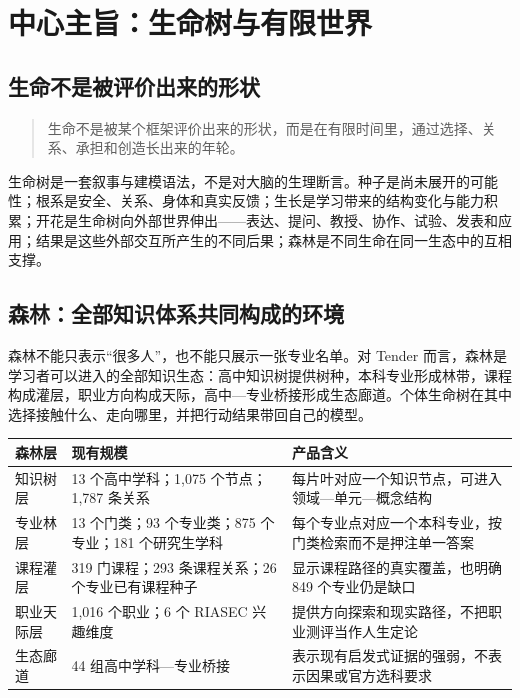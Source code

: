 \documentclass[UTF8,a4paper,11pt]{ctexart}
\begin{document}
\newpage
\section{中心主旨：生命树与有限世界}

\subsection{生命不是被评价出来的形状}

\begin{quote}
\large
生命不是被某个框架评价出来的形状，而是在有限时间里，通过选择、关系、承担和创造长出来的年轮。
\end{quote}

生命树是一套叙事与建模语法，不是对大脑的生理断言。种子是尚未展开的可能性；根系是安全、关系、身体和真实反馈；生长是学习带来的结构变化与能力积累；开花是生命树向外部世界伸出——表达、提问、教授、协作、试验、发表和应用；结果是这些外部交互所产生的不同后果；森林是不同生命在同一生态中的互相支撑。

\subsection{森林：全部知识体系共同构成的环境}

森林不能只表示“很多人”，也不能只展示一张专业名单。对 Tender 而言，森林是学习者可以进入的全部知识生态：高中知识树提供树种，本科专业形成林带，课程构成灌层，职业方向构成天际，高中—专业桥接形成生态廊道。个体生命树在其中选择接触什么、走向哪里，并把行动结果带回自己的模型。

\begin{center}
\begin{longtable}{@{}p{2.8cm}p{4.2cm}p{6.2cm}@{}}
\toprule
\textbf{森林层} & \textbf{现有规模} & \textbf{产品含义} \\
\midrule
知识树层 & 13 个高中学科；1,075 个节点；1,787 条关系 & 每片叶对应一个知识节点，可进入领域—单元—概念结构 \\
专业林层 & 13 个门类；93 个专业类；875 个专业；181 个研究生学科 & 每个专业点对应一个本科专业，按门类检索而不是押注单一答案 \\
课程灌层 & 319 门课程；293 条课程关系；26 个专业已有课程种子 & 显示课程路径的真实覆盖，也明确 849 个专业仍是缺口 \\
职业天际层 & 1,016 个职业；6 个 RIASEC 兴趣维度 & 提供方向探索和现实路径，不把职业测评当作人生定论 \\
生态廊道 & 44 组高中学科—专业桥接 & 表示现有启发式证据的强弱，不表示因果或官方选科要求 \\
\bottomrule
\end{longtable}
\end{center}
\end{document}
